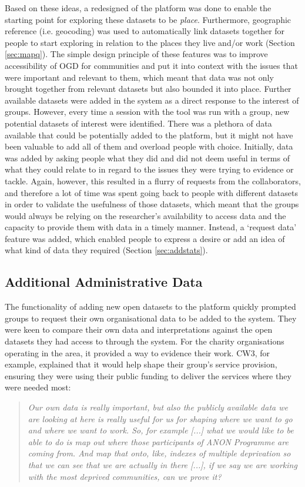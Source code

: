 Based on these ideas, a redesigned of the platform was done to enable the starting point for exploring these datasets to be \textit{place}. Furthermore, geographic reference (i.e. geocoding) was used to automatically link datasets together for people to start exploring in relation to the places they live and/or work (Section \ref{sec:mapq}). The simple design principle of these features was to improve accessibility of OGD for communities and put it into context with the issues that were important and relevant to them, which meant that data was not only brought together from relevant datasets but also bounded it into place. Further available datasets were added in the system as a direct response to the interest of groups. However, every time a session with the tool was run with a group, new potential datasets of interest were identified. There was a plethora of data available that could be potentially added to the platform, but it might not have been valuable to add all of them and overload people with choice. Initially, data was added by asking people what they did and did not deem useful in terms of what they could relate to in regard to the issues they were trying to evidence or tackle. Again, however, this resulted in a flurry of requests from the collaborators, and therefore a lot of time was spent going back to people with different datasets in order to validate the usefulness of those datasets, which meant that the groups would always be relying on the researcher's availability to access data and the capacity to provide them with data in a timely manner. Instead, a `request data' feature was added, which enabled people to express a desire or add an idea of what kind of data they required (Section \ref{sec:addstats}).

\subsection{Additional Administrative Data}
The functionality of adding new open datasets to the platform quickly prompted groups to request their own organisational data to be added to the system. They were keen to compare their own data and interpretations against the open datasets they had access to through the system. For the charity organisations operating in the area, it provided a way to evidence their work. CW3, for example, explained that it would help shape their group's service provision, ensuring they were using their public funding to deliver the services where they were needed most:
\begin{quote} 
    \textit{Our own data is really important, but also the publicly available data we are looking at here is really useful for us for shaping where we want to go and where we want to work. So, for example [...] what we would like to be able to do is map out where those participants of ANON Programme are coming from. And map that onto, like, indexes of multiple deprivation so that we can see that we are actually in there [...], if we say we are working with the most deprived communities, can we prove it?}
\end{quote}

